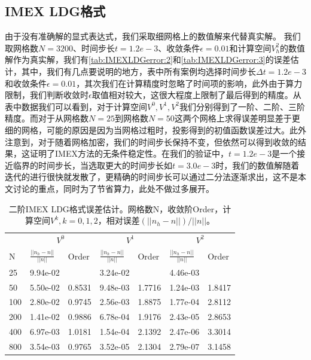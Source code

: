 \subsection{IMEX LDG格式}
由于没有准确解的显式表达式，我们采取细网格上的数值解来代替真实解。
我们取网格数$N=3200$、时间步长$t=1.2e-3$、收敛条件$\epsilon = 0.01$和计算空间$V_h^2$的数值解作为真实解，我们有\autoref{tab:IMEXLDGerror:2}和\autoref{tab:IMEXLDGerror:3}的误差估计，其中，我们有几点要说明的地方，表中所有案例均选择时间步长$\Delta t = 1.2e-3$和收敛条件$\epsilon=0.01$，其次我们在计算精度时忽略了时间项的影响，此外由于算力限制，我们判断收敛时$\epsilon$取值相对较大，这很大程度上限制了最后得到的精度。从表中数据我们可以看到，对于计算空间$V^0, V^1, V^2$我们分别得到了一阶、二阶、三阶精度。而对于从网格数$N=25$到网格数$N=50$这两个网格上求得误差明显差于更细的网格，可能的原因是因为当网格过粗时，投影得到的初值函数误差过大。此外注意到，对于随着网格加密，我们的时间步长保持不变，但依然可以得到收敛的结果，这证明了IMEX方法的无条件稳定性。在我们的验证中，$t=1.2e-3$是一个接近临界的时间步长，当选取更大的时间步长如$t=3.0e-3$时，我们的数值解随着迭代的进行很快就发散了，更精确的时间步长可以通过二分法逐渐求出，这不是本文讨论的重点，同时为了节省算力，此处不做过多展开。
\begin{table}
    \begin{tabularx}{\textwidth}{@{} *7{X} @{}}
        \toprule
            & \multicolumn{2}{c}{$V^0$} & \multicolumn{2}{c}{$V^1$} & \multicolumn{2}{c}{$V^2$}                                                     \\
        \cmidrule(lr){2-3} \cmidrule(lr){4-5} \cmidrule(lr){6-7}
        N   & $\frac{||n_h-n||}{||n||}$ & Order                     & $\frac{||n_h-n||}{||n||}$ & Order     & $\frac{||n_h-n||}{||n||}$ & Order     \\
        \midrule
        25  & 9.94e-02                  & \text{——}                 & 3.24e-02                  & \text{——} & 4.46e-03                  & \text{——} \\
        50  & 5.50e-02                  & 0.8531                    & 9.48e-03                  & 1.7716    & 1.24e-03                  & 1.8417    \\
        100 & 2.80e-02                  & 0.9745                    & 2.56e-03                  & 1.8875    & 1.77e-04                  & 2.8112    \\
        200 & 1.41e-02                  & 0.9886                    & 6.78e-04                  & 1.9176    & 2.43e-05                  & 2.8653    \\
        400 & 6.97e-03                  & 1.0181                    & 1.54e-04                  & 2.1392    & 2.47e-06                  & 3.3014    \\
        800 & 3.54e-03                  & 0.9765                    & 3.52e-05                  & 2.1304    & 2.79e-07                  & 3.1458    \\
        \bottomrule
    \end{tabularx}
    \caption{二阶IMEX LDG格式误差估计。网格数N，收敛阶Order，计算空间$V^k, k=0,1,2$，相对误差$(||n_h-n||)/||n||$。}
    \label{tab:IMEXLDGerror:2}
\end{table}


